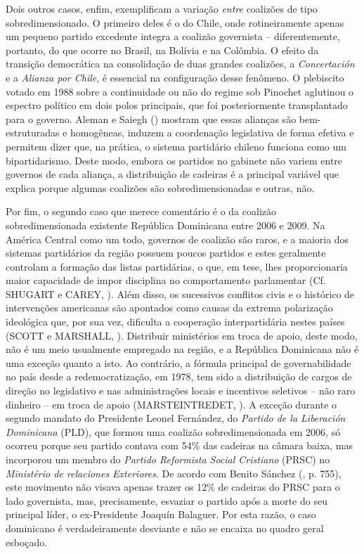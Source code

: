 Dois outros casos, enfim, exemplificam a variação \textit{entre} coalizões de tipo sobredimensionado. O primeiro deles é o do Chile, onde rotineiramente apenas um pequeno partido excedente integra a coalizão governista -- diferentemente, portanto, do que ocorre no Brasil, na Bolívia e na Colômbia. O efeito da transição democrática na consolidação de duas grandes coalizões, a \textit{Concertación} e a \textit{Alianza por Chile}, é essencial na configuração desse fenômeno. O plebiscito votado em 1988 sobre a continuidade ou não do regime sob Pinochet aglutinou o espectro político em dois polos principais, que foi posteriormente transplantado para o governo. Aleman e Saiegh (\citeyear{aleman2007}) mostram que essas alianças são bem-estruturadas e homogêneas, induzem a coordenação legislativa de forma efetiva e permitem dizer que, na prática, o sistema partidário chileno funciona como um bipartidarismo. Deste modo, embora os partidos no gabinete não variem entre governos de cada aliança, a distribuição de cadeiras é a principal variável que explica porque algumas coalizões são sobredimensionadas e outras, não.

Por fim, o segundo caso que merece comentário é o da coalizão sobredimensionada existente República Dominicana entre 2006 e 2009. Na América Central como um todo, governos de coalizão são raros, e a maioria dos sistemas partidários da região possuem poucos partidos e estes geralmente controlam a formação das listas partidárias, o que, em tese, lhes proporcionaria maior capacidade de impor disciplina no comportamento parlamentar (Cf. SHUGART e CAREY, \citeyear{shugart1992}). Além disso, os sucessivos conflitos civis e o histórico de intervenções americanas são apontados como causas da extrema polarização ideológica que, por sua vez, dificulta a cooperação interpartidária nestes países (SCOTT e MARSHALL, \citeyear{scott1998}). Distribuir ministérios em troca de apoio, deste modo, não é um meio usualmente empregado na região, e a República Dominicana não é uma exceção quanto a isto. Ao contrário, a fórmula principal de governabilidade no país desde a redemocratização, em 1978, tem sido a distribuição de cargos de direção no legislativo e nas administrações locais e incentivos seletivos -- não raro dinheiro -- em troca de apoio (MARSTEINTREDET, \citeyear{mars2008}). A exceção durante o segundo mandato do Presidente Leonel Fernández, do \textit{Partido de la Liberación Dominicana} (PLD), que formou uma coalizão sobredimensionada em 2006, só ocorreu porque seu partido contava com 54\% das cadeiras na câmara baixa, mas incorporou um membro do \textit{Partido Reformista Social Cristiano} (PRSC) no \textit{Ministério de relaciones Exteriores}. De acordo com Benito Sánchez (\citeyear{benito2010}, p. 755), este movimento não visava apenas trazer os 12\% de cadeiras do PRSC para o lado governista, mas, precisamente, esvaziar o partido após a morte do seu principal líder, o ex-Presidente Joaquín Balaguer. Por esta razão, o caso dominicano é verdadeiramente desviante e não se encaixa no quadro geral esboçado.



